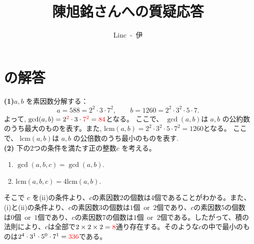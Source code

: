 \documentclass[dvipdfmx,a4paper,12pt]{jsarticle}
\title{\vspace{-3cm} 陳旭銘さんへの質疑応答}  %
\author{Linc\ -\ 伊}  %
\date{}  %
\theoremstyle{mystyle}
\begin{document}
\maketitle
\section*{\textbf{の解答}}
\noindent
\textbf{(1)}\quad $a,b$ を素因数分解する：
\[
a=588=2^2\cdot3\cdot7^2,\qquad
b=1260=2^2\cdot3^2\cdot5\cdot7.
\]
よって, $\gcd(a,b)=2^{\color{red}{2}}\cdot3\cdot {\color{red}{7}}^{\color{red}{2}}={\color{red}{84}}$となる。 \quad ここで、 $ \gcd(a,b) $は $a,b$ の公約数のうち最大のものを表す。また, 
$\mathrm{lcm}(a,b)=2^2\cdot3^2\cdot5\cdot7^2=1260$となる。 \quad ここで、 $ \mathrm{lcm}(a,b) $は $a,b$ の公倍数のうち最小のものを表す. \\


\noindent
\textbf{(2)}\quad
下の2つの条件を満たす正の整数$c$ を考える。
\begin{enumerate}[label=(\roman*)]
  \item $\gcd(a,b,c)=\gcd(a,b)$.
  \item $\mathrm{lcm}(a,b,c)=4 \mathrm{lcm}(a,b)$.
\end{enumerate}

\noindent
そこで $c$ を(ii)の条件より、$c$の素因数$2$の個数は$4$個であることがわかる。また、(i)と(ii)の条件より、$c$の素因数$3$の個数は$1$個\ or\ $2$個であり、$c$の素因数$5$の個数は$0$個\ or\ $1$個であり、$c$の素因数$7$の個数は$1$個\ or\ $2$個である。したがって、積の法則により、$c$は全部で$2\times2\times2={\color{red}{8}}$通り存在する。そのような$c$の中で最小のものは$2^4\cdot3^1\cdot5^0\cdot7^1={\color{red}{336}}$である。\\[1em]
\end{document}
